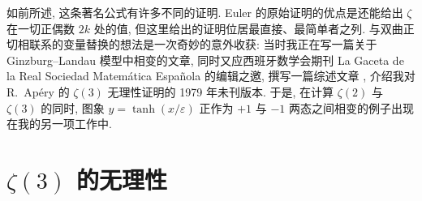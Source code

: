 \begin{remark}\label{rem:1.3}
如前所述, 这条著名公式有许多不同的证明. Euler 的原始证明的优点是还能给出 $\zeta$ 在一切正偶数 $2k$ 处的值, 但这里给出的证明位居最直接、最简单者之列. 与双曲正切相联系的变量替换的想法是一次奇妙的意外收获: 当时我正在写一篇关于 Ginzburg--Landau 模型中相变的文章, 同时又应西班牙数学会期刊 La Gaceta de la Real Sociedad Matemática Española 的编辑之邀, 撰写一篇综述文章 \cite{b26}, 介绍我对 R.~Apéry 的 $\zeta(3)$ 无理性证明的 1979 年未刊版本. 于是, 在计算 $\zeta(2)$ 与 $\zeta(3)$ 的同时, 图象 $y = \tanh(x/\varepsilon)$ 正作为 $+1$ 与 $-1$ 两态之间相变的例子出现在我的另一项工作中.
\end{remark}

\section{$\zeta(3)$ 的无理性}

